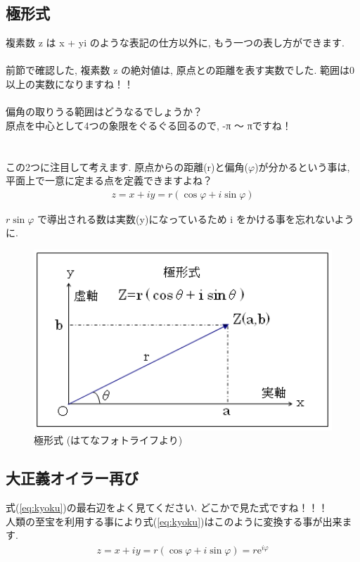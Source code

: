 \documentclass[11pt,a4paper]{jreport}
\begin{document}
\subsection{極形式}
複素数 z は x + yi のような表記の仕方以外に, もう一つの表し方ができます.\\
\\
前節で確認した, 複素数 z の絶対値は, 原点との距離を表す実数でした. 範囲は0以上の実数になりますね！！\\
\\
偏角の取りうる範囲はどうなるでしょうか？\\
原点を中心として4つの象限をぐるぐる回るので, -π ～ πですね！\\
\\
\\
この2つに注目して考えます. 原点からの距離(r)と偏角($\varphi$)が分かるという事は, 平面上で一意に定まる点を定義できますよね？
\begin{eqnarray}
z = x + iy = r(\cos \varphi + i\sin \varphi)
\label{eq:kyoku}
\end{eqnarray}

$r\sin\varphi$ で導出される数は実数(y)になっているため i をかける事を忘れないように.\\

\begin{figure}[H]
\label{im:polar}
  \centering
  \includegraphics[width=120mm,bb=0 0 406 246]{figures/polar.png}
  \caption{極形式 (はてなフォトライフより)}
\end{figure}

\subsection{大正義オイラー再び}
式(\ref{eq:kyoku})の最右辺をよく見てください. どこかで見た式ですね！！！\\
人類の至宝を利用する事により式(\ref{eq:kyoku})はこのように変換する事が出来ます.\\
\begin{eqnarray}
z = x + iy = r(\cos\varphi + i\sin \varphi) = r \mathrm{e}^{i\varphi}
\end{eqnarray}
\end{document}
